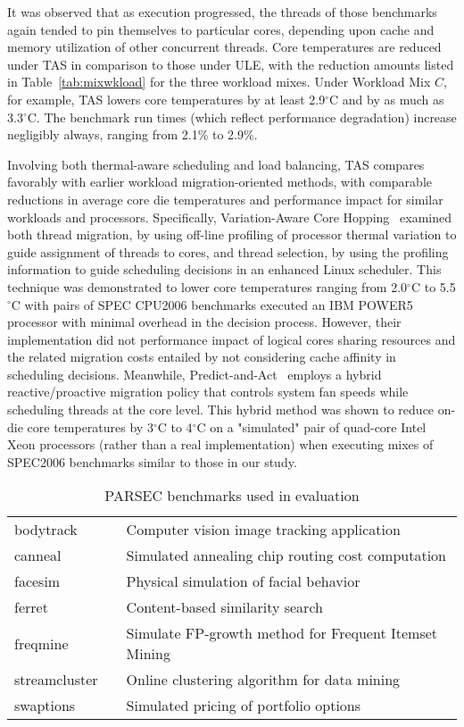 It was observed that as execution progressed, the threads of those
benchmarks again tended to pin themselves to particular cores, depending
upon cache and memory utilization of other concurrent threads.  Core
temperatures are reduced under TAS in comparison to those under ULE,
with the reduction amounts listed in Table~\ref{tab:mixwkload} for the
three workload mixes.  Under Workload Mix $C$, for example, TAS lowers
core temperatures by at least 2.9$^{\circ}$C and by as much as
3.3$^{\circ}$C.  The benchmark run times (which reflect performance
degradation) increase negligibly always, ranging from 2.1\% to 2.9\%.

Involving both thermal-aware scheduling and load balancing, TAS compares
favorably with earlier workload migration-oriented methods, with
comparable reductions in average core die temperatures and performance
impact for similar workloads and processors.  Specifically,
Variation-Aware Core Hopping~\cite{Kursun2009} examined both thread
migration, by using off-line profiling of processor thermal variation to
guide assignment of threads to cores, and thread selection, by using the
profiling information to guide scheduling decisions in an enhanced Linux
scheduler.  This technique was demonstrated to lower core temperatures
ranging from 2.0$^{\circ}$C to 5.5$^{\circ}$C with pairs of SPEC CPU2006
benchmarks executed an IBM POWER5 processor with minimal overhead in the
decision process. However, their implementation did not performance
impact of logical cores sharing resources and the related
migration costs entailed by not considering cache affinity in scheduling
decisions.  Meanwhile, Predict-and-Act~\cite{Ayoub2011}
employs a hybrid reactive/proactive migration policy that controls
system fan speeds while scheduling threads at the core level.  This
hybrid method  was shown
to reduce on-die core temperatures by 3$^{\circ}$C to 4$^{\circ}$C on a
"simulated" pair of quad-core Intel Xeon processors (rather than a real
implementation) when executing mixes of SPEC2006 benchmarks similar to
those in our study.

\begin{table}[tbp] 
\centering
 \caption{PARSEC benchmarks used in evaluation}
\label{tab:parsecbench}
\begin{tabular}[bthp]{l l p{5cm}} 
\hline 
\hline 
bodytrack &  & Computer vision image tracking application \\
canneal &  & Simulated annealing chip routing cost computation \\
facesim &  & Physical simulation of facial behavior \\
ferret &  & Content-based similarity search \\
freqmine &  & Simulate FP-growth method for Frequent Itemset Mining \\
streamcluster &  & Online clustering algorithm for data mining \\
swaptions &  & Simulated pricing of portfolio options \\
\hline
\end{tabular}
\end{table}
